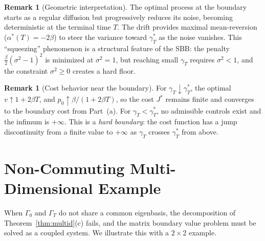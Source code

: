 \documentclass[12pt]{article}
\theoremstyle{definition}
\newtheorem{remark}[theorem]{Remark}
\begin{document}
\begin{remark}[Geometric interpretation]
The optimal process at the boundary starts as a regular diffusion
but progressively reduces its noise, becoming deterministic at the
terminal time $T$.
The drift provides maximal mean-reversion ($\alpha^*(T) = -2\beta$)
to steer the variance toward $\gamma_T^*$ as the noise vanishes.
This ``squeezing'' phenomenon is a structural feature of the SBB:
the penalty $\frac{\beta}{2}(\sigma^2 - 1)^2$ is minimized at
$\sigma^2 = 1$, but reaching small $\gamma_T$ requires $\sigma^2 < 1$,
and the constraint $\sigma^2 \ge 0$ creates a hard floor.
\end{remark}

\begin{remark}[Cost behavior near the boundary]
For $\gamma_T \downarrow \gamma_T^*$, the optimal $v \uparrow 1 + 2\beta T$,
and $p_0 \uparrow \beta/(1+2\beta T)$, so the cost $J^*$ remains finite
and converges to the boundary cost from Part~(a).
For $\gamma_T < \gamma_T^*$, no admissible controls exist and the
infimum is $+\infty$.
This is a \emph{hard boundary}: the cost function has a jump
discontinuity from a finite value to $+\infty$ as $\gamma_T$ crosses
$\gamma_T^*$ from above.
\end{remark}

\section{Non-Commuting Multi-Dimensional Example}\label{sec:noncommuting}

When $\Gamma_0$ and $\Gamma_T$ do not share a common eigenbasis,
the decomposition of Theorem~\ref{thm:multid}(c) fails, and
the matrix boundary value problem must be solved as a coupled system.
We illustrate this with a $2 \times 2$ example.
\end{document}
